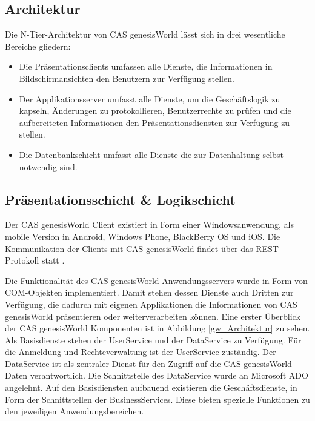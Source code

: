 \subsection{Architektur}

Die N-Tier-Architektur von CAS genesisWorld lässt sich in drei wesentliche Bereiche gliedern:

\begin{itemize}

	\item Die Präsentationsclients umfassen alle Dienste, die Informationen in Bildschirmansichten den Benutzern zur Verfügung stellen.
	
	\item Der Applikationsserver umfasst alle Dienste, um die Geschäftslogik zu kapseln, Änderungen zu protokollieren, Benutzerrechte zu prüfen und die aufbereiteten Informationen den Präsentationsdiensten zur Verfügung zu stellen.
	
	\item Die Datenbankschicht umfasst alle Dienste die zur Datenhaltung selbst notwendig sind.
\end{itemize}


\subsection{Präsentationsschicht \& Logikschicht}

Der CAS genesisWorld Client existiert in Form einer Windowsanwendung, als mobile Version in Android, Windows Phone, BlackBerry OS und iOS. Die Kommunikation der Clients mit CAS genesisWorld findet über das REST-Protokoll statt \cite{cas2013a}.

Die Funktionalität des CAS genesisWorld Anwendungsservers wurde in Form von COM-Objekten implementiert. Damit stehen dessen Dienste auch Dritten zur Verfügung, die dadurch mit eigenen Applikationen die Informationen von CAS genesisWorld präsentieren oder weiterverarbeiten können. Eine erster Überblick der CAS genesisWorld Komponenten ist in Abbildung \ref{gw_Architektur} zu sehen. Als Basisdienste stehen der UserService und der DataService zu Verfügung. Für die Anmeldung und Rechteverwaltung ist der UserService zuständig. Der DataService ist als zentraler Dienst für den Zugriff auf die CAS genesisWorld Daten verantwortlich. Die Schnittstelle des DataService wurde an Microsoft ADO angelehnt. Auf den Basisdiensten aufbauend existieren die Geschäftsdienste, in Form der Schnittstellen der BusinessServices. Diese bieten spezielle Funktionen zu den jeweiligen Anwendungsbereichen.

